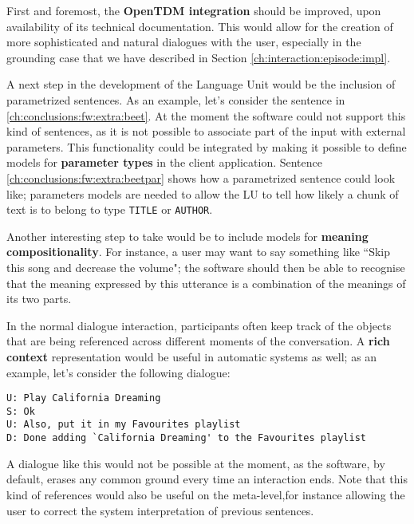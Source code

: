 First and foremost, the \textbf{OpenTDM integration} should be improved, upon availability of its technical documentation. This would allow for the creation of more sophisticated and natural dialogues with the user, especially in the grounding case that we have described in Section \ref{ch:interaction:episode:impl}.

A next step in the development of the Language Unit would be the inclusion of parametrized sentences. As an example, let's consider the sentence in \ref{ch:conclusions:fw:extra:beet}. At the moment the software could not support this kind of sentences, as it is not possible to associate part of the input with external parameters. This functionality could be integrated by making it possible to define models for \textbf{parameter types} in the client application. Sentence \ref{ch:conclusions:fw:extra:beetpar} shows how a parametrized sentence could look like; parameters models are needed to allow the LU to tell how likely a chunk of text is to belong to type \texttt{TITLE} or \texttt{AUTHOR}.

\label{ch:conclusions:fw:extra:beet}
\vspace{-0.7cm}
\label{ch:conclusions:fw:extra:beetpar}

Another interesting step to take would be to include models for \textbf{meaning compositionality}. For instance, a user may want to say something like ``Skip this song and decrease the volume"; the software should then be able to recognise that the meaning expressed by this utterance is a combination of the meanings of its two parts.

In the normal dialogue interaction, participants often keep track of the objects that are being referenced across different moments of the conversation. A \textbf{rich context} representation would be useful in automatic systems as well; as an example, let's consider the following dialogue:
\begin{verbatim}
U: Play California Dreaming
S: Ok
U: Also, put it in my Favourites playlist
D: Done adding `California Dreaming' to the Favourites playlist
\end{verbatim}
A dialogue like this would not be possible at the moment, as the software, by default, erases any common ground every time an interaction ends. Note that this kind of references would also be useful on the meta-level,for instance allowing the user to correct the system interpretation of previous sentences.

